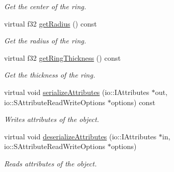 \begin{DoxyCompactItemize}
\begin{DoxyCompactList}\small\item\em Get the center of the ring. \end{DoxyCompactList}\item 
\hypertarget{classirr_1_1scene_1_1_c_particle_ring_emitter_a9e600406a1857ca40275cde382b24b64}{virtual f32 \hyperlink{classirr_1_1scene_1_1_c_particle_ring_emitter_a9e600406a1857ca40275cde382b24b64}{get\-Radius} () const }\label{classirr_1_1scene_1_1_c_particle_ring_emitter_a9e600406a1857ca40275cde382b24b64}

\begin{DoxyCompactList}\small\item\em Get the radius of the ring. \end{DoxyCompactList}\item 
\hypertarget{classirr_1_1scene_1_1_c_particle_ring_emitter_ab93346d9f68c42cc613bf0b135a04ba2}{virtual f32 \hyperlink{classirr_1_1scene_1_1_c_particle_ring_emitter_ab93346d9f68c42cc613bf0b135a04ba2}{get\-Ring\-Thickness} () const }\label{classirr_1_1scene_1_1_c_particle_ring_emitter_ab93346d9f68c42cc613bf0b135a04ba2}

\begin{DoxyCompactList}\small\item\em Get the thickness of the ring. \end{DoxyCompactList}\item 
\hypertarget{classirr_1_1scene_1_1_c_particle_ring_emitter_a07d2f7fffcb7948e6e82b3cd82fdb0de}{virtual void \hyperlink{classirr_1_1scene_1_1_c_particle_ring_emitter_a07d2f7fffcb7948e6e82b3cd82fdb0de}{serialize\-Attributes} (io\-::\-I\-Attributes $\ast$out, io\-::\-S\-Attribute\-Read\-Write\-Options $\ast$options) const }\label{classirr_1_1scene_1_1_c_particle_ring_emitter_a07d2f7fffcb7948e6e82b3cd82fdb0de}

\begin{DoxyCompactList}\small\item\em Writes attributes of the object. \end{DoxyCompactList}\item 
\hypertarget{classirr_1_1scene_1_1_c_particle_ring_emitter_a94c4dd4e69d6289f485046e6afd777a1}{virtual void \hyperlink{classirr_1_1scene_1_1_c_particle_ring_emitter_a94c4dd4e69d6289f485046e6afd777a1}{deserialize\-Attributes} (io\-::\-I\-Attributes $\ast$in, io\-::\-S\-Attribute\-Read\-Write\-Options $\ast$options)}\label{classirr_1_1scene_1_1_c_particle_ring_emitter_a94c4dd4e69d6289f485046e6afd777a1}

\begin{DoxyCompactList}\small\item\em Reads attributes of the object. \end{DoxyCompactList}\end{DoxyCompactItemize}


